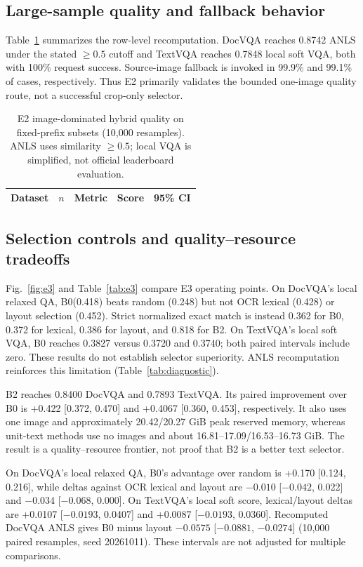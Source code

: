 ﻿\documentclass[conference]{IEEEtran}
\newcommand{\bzero}{\textsc{B0}\xspace}
\newcommand{\btwo}{\textsc{B2}\xspace}
\begin{document}
\subsection{Large-sample quality and fallback behavior}
Table~\ref{tab:e2} summarizes the row-level recomputation. DocVQA reaches 0.8742 ANLS under the stated $\geq0.5$ cutoff and TextVQA reaches 0.7848 local soft VQA, both with 100\% request success. Source-image fallback is invoked in 99.9\% and 99.1\% of cases, respectively. Thus E2 primarily validates the bounded one-image quality route, not a successful crop-only selector.

\begin{table}[!t]
\centering
\caption{E2 image-dominated hybrid quality on fixed-prefix subsets (10,000 resamples). ANLS uses similarity $\geq0.5$; local VQA is simplified, not official leaderboard evaluation.}
\label{tab:e2}
\footnotesize
\setlength{\tabcolsep}{3.5pt}
\begin{tabular}{lrrrc}
\toprule
Dataset & $n$ & Metric & Score & 95\% CI \\
\midrule

\end{tabular}
\end{table}

\subsection{Selection controls and quality--resource tradeoffs}
Fig.~\ref{fig:e3} and Table~\ref{tab:e3} compare E3 operating points. On DocVQA's local relaxed QA, \bzero (0.418) beats random (0.248) but not OCR lexical (0.428) or layout selection (0.452). Strict normalized exact match is instead 0.362 for B0, 0.372 for lexical, 0.386 for layout, and 0.818 for B2. On TextVQA's local soft VQA, \bzero reaches 0.3827 versus 0.3720 and 0.3740; both paired intervals include zero. These results do not establish selector superiority. ANLS recomputation reinforces this limitation (Table~\ref{tab:diagnostic}).

\btwo reaches 0.8400 DocVQA and 0.7893 TextVQA. Its paired improvement over \bzero is +0.422 [0.372, 0.470] and +0.4067 [0.360, 0.453], respectively. It also uses one image and approximately 20.42/20.27 GiB peak reserved memory, whereas unit-text methods use no images and about 16.81--17.09/16.53--16.73 GiB. The result is a quality--resource frontier, not proof that \btwo is a better text selector.

On DocVQA's local relaxed QA, \bzero's advantage over random is +0.170 [0.124, 0.216], while deltas against OCR lexical and layout are $-0.010$ [$-0.042$, 0.022] and $-0.034$ [$-0.068$, 0.000]. On TextVQA's local soft score, lexical/layout deltas are +0.0107 [$-0.0193$, 0.0407] and +0.0087 [$-0.0193$, 0.0360]. Recomputed DocVQA ANLS gives \bzero minus layout $-0.0575$ [$-0.0881$, $-0.0274$] (10,000 paired resamples, seed 20261011). These intervals are not adjusted for multiple comparisons.
\end{document}
